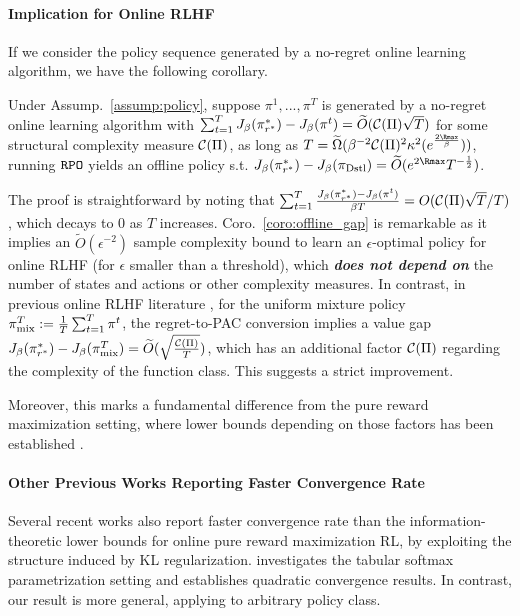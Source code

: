 \paragraph{Implication for Online RLHF}
If we consider the policy sequence generated by a no-regret online learning algorithm, we have the following corollary.
\begin{corollary}\label{coro:offline_gap}
    Under Assump.~\ref{assump:policy}, suppose $\pi^1,...,\pi^T$ is generated by a no-regret online learning algorithm with $\sum_{t=1}^T J_\beta(\pi^*_{r^*}) - J_\beta(\pi^t) = \widetilde{O}(\mathcal{C}(\Pi)\sqrt{T})$ for some structural complexity measure $\mathcal{C}(\Pi)$, as long as $T = \tilde{\Omega}(\beta^{-2}\Complexity(\Pi)^2\kappa^2(e^{\frac{2{\Rmax}}{\beta}}))$, running ${\texttt{RPO}}$ yields an offline policy s.t. $J_\beta(\pi^*_{r^*}) - J_\beta(\pi_\SELF) = \tilde{O}(e^{2{\Rmax}} T^{-\frac{1}{2}})$.
\end{corollary}
The proof is straightforward by noting that $\sum_{t=1}^T\frac{J_\beta(\pi^*_{r^*}) - J_\beta(\pi^t)}{\beta T} = O(\mathcal{C}(\Pi)\sqrt{T}/T)$, which decays to 0 as $T$ increases.
Coro.~\ref{coro:offline_gap} is remarkable as it implies an $\tilde{O}(\epsilon^{-2})$ sample complexity bound to learn an $\epsilon$-optimal policy for online RLHF (for $\epsilon$ smaller than a threshold), which \textbf{\emph{does not depend on}} the number of states and actions or other complexity measures.
In contrast, in previous online RLHF literature \citep{xiong2024iterative, xie2024exploratory,cen2024value,zhang2024self}, for the uniform mixture policy $\pi^T_{\text{mix}} := \frac{1}{T}\sum_{t=1}^T \pi^t$, the regret-to-PAC conversion implies a value gap $J_\beta(\pi^*_{r^*}) - J_\beta(\pi^T_{\text{mix}}) = \widetilde{O}(\sqrt{\frac{\mathcal{C}(\Pi)}{T}})$, which has an additional factor $\mathcal{C}(\Pi)$ regarding the complexity of the function class.
This suggests a strict improvement.
%


Moreover, this marks a fundamental difference from the pure reward maximization setting, where lower bounds depending on those factors has been established \citep{auer2002nonstochastic,dani2008stochastic}.
%


\paragraph{Other Previous Works Reporting Faster Convergence Rate}
Several recent works also report faster convergence rate than the information-theoretic lower bounds for online pure reward maximization RL, by exploiting the structure induced by KL regularization.
\citep{shi2024crucial} investigates the tabular softmax parametrization setting and establishes quadratic convergence results.
In contrast, our result is more general, applying to arbitrary policy class.

